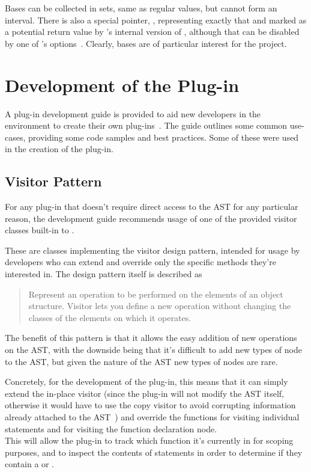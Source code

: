Bases can be collected in sets, same as regular values, but cannot form an interval. There is also a special pointer, , representing exactly that and marked as a potential return value by 's internal version of \malloc{}, although that can be disabled by one of 's options~\cite{framamalloc}. Clearly, bases are of particular interest for the project.

\section{Development of the  Plug-in}

A plug-in development guide is provided to aid new developers in the  environment to create their own plug-ins~\cite{framaplug}. The guide outlines some common use-cases, providing some code samples and best practices. Some of these were used in the creation of the  plug-in.

\subsection{Visitor Pattern}

For any plug-in that doesn't require direct access to the AST for any particular reason, the development guide recommends usage of one of the provided visitor classes built-in to .

These are classes implementing the visitor design pattern, intended for usage by developers who can extend and override only the specific methods they're interested in. The design pattern itself is described as

\begin{quote}
	Represent an operation to be performed on the elements of an object structure. Visitor lets you define a new operation without changing the classes of the elements on which it operates.~\cite{gof}
\end{quote}

The benefit of this pattern is that it allows the easy addition of new operations on the AST, with the downside being that it's difficult to add new types of node to the AST, but given the nature of the AST new types of nodes are rare.

Concretely, for the development of the plug-in, this means that it can simply extend the in-place visitor (since the plug-in will not modify the AST itself, otherwise it would have to use the copy visitor to avoid corrupting information already attached to the AST~\cite{framaplug}) and override the functions for visiting individual statements and for visiting the function declaration node. \\
This will allow the plug-in to track which function it's currently in for scoping purposes, and to inspect the contents of statements in order to determine if they contain a \malloc{} or \free{}.

